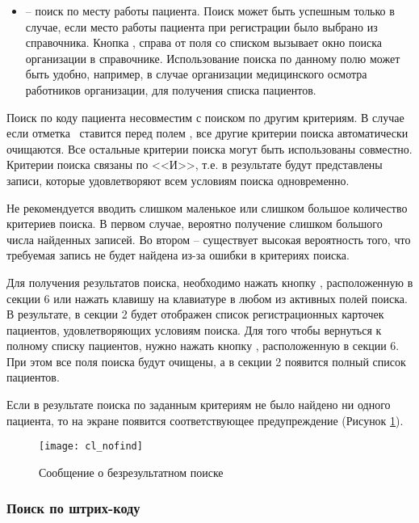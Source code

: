 \begin{itemize}
 \item	{} – поиск по месту работы пациента. Поиск может быть успешным только в случае, если место работы пациента при регистрации было выбрано из справочника. Кнопка , справа от поля со списком вызывает окно поиска организации в справочнике. Использование поиска по данному полю может быть удобно, например, в случае организации медицинского осмотра работников организации, для получения списка пациентов.
\end{itemize}
 
Поиск по коду пациента несовместим с поиском по другим критериям. В случае если отметка \putx~ставится перед полем , все другие критерии поиска автоматически очищаются. Все остальные критерии поиска могут быть использованы совместно. Критерии поиска связаны по <<И>>, т.е. в результате будут представлены записи, которые удовлетворяют всем условиям поиска одновременно.


\begin{prim}
Не рекомендуется вводить слишком маленькое или слишком большое количество критериев поиска. В первом случае, вероятно получение слишком большого числа найденных записей. Во втором – существует высокая вероятность того, что требуемая запись не будет найдена из-за ошибки в критериях поиска.
\end{prim}
    
Для получения результатов поиска, необходимо нажать кнопку  , расположенную в секции 6 или нажать клавишу  на клавиатуре в любом из активных полей поиска. В результате, в секции 2 будет отображен список регистрационных карточек пациентов, удовлетворяющих условиям поиска. Для того чтобы вернуться к полному списку пациентов, нужно нажать кнопку , расположенную в секции 6. При этом все поля поиска будут очищены, а в секции 2 появится полный список пациентов.

Если в результате поиска по заданным критериям не было найдено ни одного пациента, то на экране появится соответствующее предупреждение (Рисунок \ref{img_cl_nofind}). 

\begin{figure}[ht]\centering
 \texttt{[image: cl\_nofind]}
 \caption{Сообщение о безрезультатном поиске}
 \label{img_cl_nofind}
\end{figure} 

\subsubsection{Поиск по штрих-коду}

